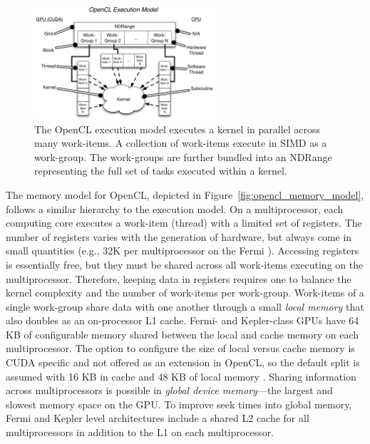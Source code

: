 \documentclass{report}
\begin{document}
\begin{figure}
\centering
\includegraphics[width=0.6\textwidth]{../figures/prospectus/opencl_execute_model.pdf}
\caption{The OpenCL execution model executes a kernel in parallel across many work-items. A collection of work-items execute in SIMD as a work-group. The work-groups are further bundled into an NDRange representing the full set of tasks executed within a kernel. } 
\label{fig:opencl_execute_model}
\end{figure}

The memory model for OpenCL, depicted in Figure~\ref{fig:opencl_memory_model}, follows a similar hierarchy to the execution model. On a multiprocessor, each computing core executes a work-item (thread) with a limited set of registers. The number of registers varies with the generation of hardware, but always come in small quantities (e.g., 32K per multiprocessor on the Fermi \cite{CudaGuide2011}). Accessing registers is essentially free, but they must be shared across all work-items executing on the multiprocessor. Therefore, keeping data in registers requires one to balance the kernel complexity and the number of work-items per work-group. Work-items of a single work-group share data with one another through a small \textit{local memory} that also doubles as an on-processor L1 cache. Fermi- and Kepler-class GPUs have 64 KB of configurable memory shared between the local and cache memory on each multiprocessor. The option to configure the size of local versus cache memory is CUDA specific and not offered as an extension in OpenCL, so the default split is assumed with 16 KB in cache and 48 KB of local memory \cite{CudaGuide2013}.
Sharing information across multiprocessors is possible in \textit{global device memory}---the largest and slowest memory space on the GPU. To improve seek times into global memory, Fermi and Kepler level architectures include a shared L2 cache for all multiprocessors in addition to the L1 on each multiprocessor. 
\end{document}
